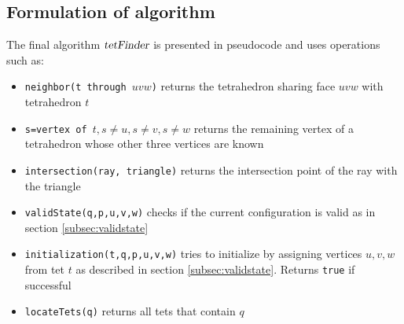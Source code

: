 \documentclass[../thesis.tex]{subfiles}
\begin{document}
\subsection{Formulation of algorithm}\label{subsec:tetfinder}
The final algorithm $\textsl{tetFinder}$ is presented in pseudocode and uses operations such as:
\begin{itemize}
  \item \texttt{neighbor(t through $uvw$)} returns the tetrahedron sharing face $uvw$ with tetrahedron $t$
  \item \texttt{s=vertex of $t, s \neq u, s \neq v, s \neq w$} returns the remaining vertex of a tetrahedron whose other three
  vertices are known
  \item \texttt{intersection(ray, triangle)} returns the intersection point of the ray with the triangle %
  \item \texttt{validState(q,p,u,v,w)} checks if the current configuration is valid as in section \ref{subsec:validstate}
  \item \texttt{initialization(t,q,p,u,v,w)} tries to initialize by assigning vertices $u,v,w$ from tet $t$ as described in section \ref{subsec:validstate}. Returns \texttt{true} if successful
  \item \texttt{locateTets(q)} returns all tets that contain $q$
\end{itemize}
\end{document}
